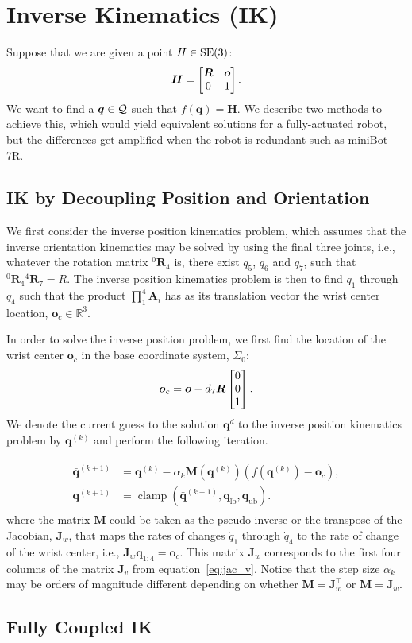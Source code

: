 \section{Inverse Kinematics (IK)}
\label{sec:inversekin}

Suppose that we are given a point $H \in \mathrm{SE}(3)$: 
\[ \bm{H} = \begin{bmatrix}\bm{R} & \bm{o} \\ 0 & 1\end{bmatrix}. \]
We want to find a $\bm{q} \in \mathcal{Q}$ such that $f(\bm{q}) = \bm{H}$. We
describe two methods to achieve this, which would yield equivalent solutions for
a fully-actuated robot, but the differences get amplified when the robot is
redundant such as miniBot-7R.

\subsection{IK by Decoupling Position and Orientation}
\label{ssec:ik_decoupling}

We first consider the inverse position kinematics problem, 
which assumes that the inverse orientation kinematics may be 
solved by using the final three joints, i.e., whatever the 
rotation matrix $^0\bm{R}_4$ is, there exist $q_5$, $q_6$ and $q_7$, 
such that ${}^0\bm{R}_4 {}^4\bm{R}_7 = R$. The inverse position kinematics 
problem is then to find $q_1$ through $q_4$ such that the product $\prod_1^4
\bm{A}_i$ has as its translation vector the wrist center location, $\bm{o}_c \in
\mathbb{R}^3$.

In order to solve the inverse position problem, we first find the location of
the wrist center $\bm{o}_c$ in the base coordinate system,
$\Sigma_0$: \[ \bm{o}_c = \bm{o} - d_7 \bm{R} \begin{bmatrix}0 \\ 0 \\ 1\end{bmatrix}. \]
%
We denote the current guess to the solution $\bm{q}^d$ to the inverse position
kinematics problem by $\bm{q}^{(k)}$ and perform the following iteration.

\begin{align}
  \begin{split}
  \bar{\bm{q}}^{(k+1)} &= \bm{q}^{(k)} - \alpha_k \bm{M}\left(\bm{q}^{(k)}
  \right)\left(f\left(\bm{q}^{(k)}\right) - \bm{o}_c \right), \\
  \bm{q}^{(k+1)} &= \operatorname{clamp}\left(\bar{\bm{q}}^{(k+1)}, \bm{q}_{\text{lb}}, \bm{q}_{\text{ub}} \right).
  \end{split}
  \label{eq:ipk_iter}
\end{align}
%
where the matrix $\bm{M}$ could be taken as the pseudo-inverse or the transpose
of the Jacobian, $\bm{J}_w$, that maps the rates of changes $\dot{q}_1$ through
$\dot{q}_4$ to the rate of change of the wrist center, i.e., $\bm{J}_w
\dot{\bm{q}}_{1:4} = \dot{\bm{o}}_c$. This matrix $\bm{J}_w$ corresponds to the 
first four columns of the matrix $\bm{J}_v$ from equation~\eqref{eq:jac_v}.
%
Notice that the step size $\alpha_k$ may be orders of magnitude different
depending on whether $\bm{M} = \bm{J}_w^\top$ or $\bm{M} = \bm{J}_w^\dagger$. 


\subsection{Fully Coupled IK}
\label{ssec:ik_full}